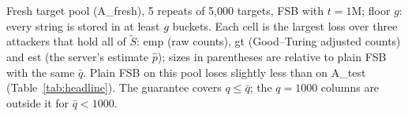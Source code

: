 Fresh target pool (A\_fresh), 5 repeats of 5,000 targets, FSB with $t=1$M; floor $g$: every string is stored in at least $g$ buckets. Each cell is the largest loss over three attackers that hold all of $\tilde S$: emp (raw counts), gt (Good--Turing adjusted counts) and est (the server's estimate $\hat p$); sizes in parentheses are relative to plain FSB with the same $\bar q$. Plain FSB on this pool loses slightly less than on A\_test (Table~\ref{tab:headline}). The guarantee covers $q\le\bar q$; the $q=1000$ columns are outside it for $\bar q<1000$.
